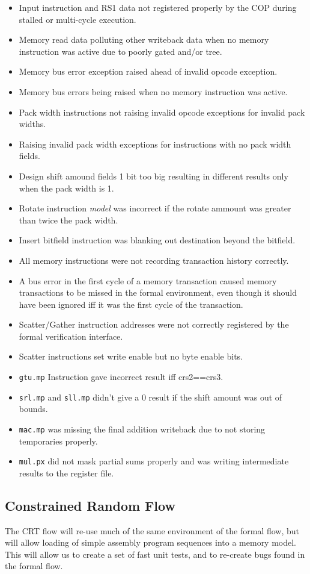 \begin{itemize}
\item Input instruction and RS1 data not registered properly by the COP during
    stalled or multi-cycle execution.
\item Memory read data polluting other writeback data when no memory
    instruction was active due to poorly gated and/or tree.
\item Memory bus error exception raised ahead of invalid opcode exception.
\item Memory bus errors being raised when no memory instruction was active.
\item Pack width instructions not raising invalid opcode exceptions for
    invalid pack widths.
\item Raising invalid pack width exceptions for instructions with no pack width
    fields.
\item Design shift amound fields 1 bit too big resulting in different results
    only when the pack width is 1.
\item Rotate instruction {\em model} was incorrect if the rotate ammount was
    greater than twice the pack width.
\item Insert bitfield instruction was blanking out destination beyond the
    bitfield.
\item All memory instructions were not recording transaction history correctly.
\item A bus error in the first cycle of a memory transaction caused memory
    transactions to be missed in the formal environment, even though it
    should have been ignored iff it was the first cycle of the transaction.
\item Scatter/Gather instruction addresses were not correctly registered
    by the formal verification interface.
\item Scatter instructions set write enable but no byte enable bits.
\item {\tt gtu.mp} Instruction gave incorrect result iff crs2==crs3.
\item {\tt srl.mp} and {\tt sll.mp} didn't give a 0 result if the shift
    amount was out of bounds.
\item {\tt mac.mp} was missing the final addition writeback due to not
    storing temporaries properly.
\item {\tt mul.px} did not mask partial sums properly and was writing
    intermediate results to the register file.
\end{itemize}

\subsection{Constrained Random Flow}

The CRT flow will re-use much of the same environment of the formal flow,
but will allow loading of simple assembly program sequences into a
memory model. This will allow us to create a set of fast unit tests, and to
re-create bugs found in the formal flow.

